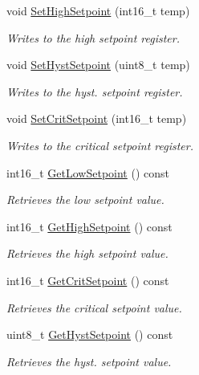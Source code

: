 \begin{DoxyCompactItemize}
void \hyperlink{classcubesat_1_1ADT7311_a6e2fef4825d733d11fed423e0c19edcd}{Set\+High\+Setpoint} (int16\+\_\+t temp)
\begin{DoxyCompactList}\small\item\em Writes to the high setpoint register. \end{DoxyCompactList}\item 
void \hyperlink{classcubesat_1_1ADT7311_a769bd9152682b5ebd7408d1796116b71}{Set\+Hyst\+Setpoint} (uint8\+\_\+t temp)
\begin{DoxyCompactList}\small\item\em Writes to the hyst. setpoint register. \end{DoxyCompactList}\item 
void \hyperlink{classcubesat_1_1ADT7311_a5351ef5f5982332d1a8a08677f93e859}{Set\+Crit\+Setpoint} (int16\+\_\+t temp)
\begin{DoxyCompactList}\small\item\em Writes to the critical setpoint register. \end{DoxyCompactList}\item 
int16\+\_\+t \hyperlink{classcubesat_1_1ADT7311_a4d2ab8dec28559cd1d2a2030b2b828d2}{Get\+Low\+Setpoint} () const
\begin{DoxyCompactList}\small\item\em Retrieves the low setpoint value. \end{DoxyCompactList}\item 
int16\+\_\+t \hyperlink{classcubesat_1_1ADT7311_adb40c389c5e36aa4c2f0e59712df9333}{Get\+High\+Setpoint} () const
\begin{DoxyCompactList}\small\item\em Retrieves the high setpoint value. \end{DoxyCompactList}\item 
int16\+\_\+t \hyperlink{classcubesat_1_1ADT7311_ace49d19de024ba042aa8f9cfd6aee526}{Get\+Crit\+Setpoint} () const
\begin{DoxyCompactList}\small\item\em Retrieves the critical setpoint value. \end{DoxyCompactList}\item 
uint8\+\_\+t \hyperlink{classcubesat_1_1ADT7311_a9e7fd53a9da8c18626f766cafa2afe76}{Get\+Hyst\+Setpoint} () const
\begin{DoxyCompactList}\small\item\em Retrieves the hyst. setpoint value. \end{DoxyCompactList}\item 

\end{DoxyCompactItemize}
